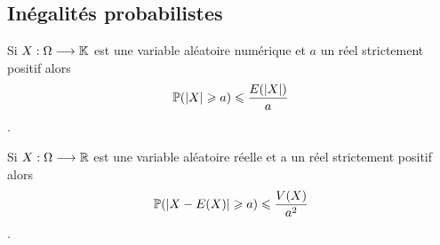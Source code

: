 \subsection{Inégalités probabilistes}
\begin{defprop}
    Si \(X : \Omega \longrightarrow \mathbb{K}\) est une variable aléatoire numérique et \(a\) un réel strictement positif alors
    \[\mathbb{P} (\left\lvert X\right\rvert\geqslant a) \leqslant \frac{E (\left\lvert X\right\rvert)}{a}\] .
\end{defprop}
\begin{defprop}
    Si \(X : \Omega \longrightarrow \mathbb{R}\) est une variable aléatoire réelle et a un réel strictement positif alors
    \[\mathbb{P} (\left\lvert X - E(X)\right\rvert \geqslant a) \leqslant \frac{V (X)}{a^2}\] .
\end{defprop}
